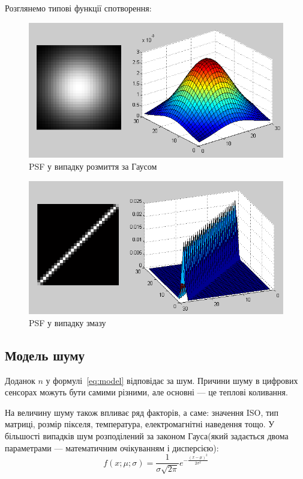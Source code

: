 \documentclass{diploma}
\begin{document}
      Розглянемо типові функції спотворення:
      \begin{figure}
        \centering
        \includegraphics[width=\linewidth]{gaussian-blur.png}
        \caption{PSF у випадку розмиття за Гаусом}
        \label{fig:gaussian-blur}
      \end{figure}
      \begin{figure}
        \centering
        \includegraphics[width=\linewidth]{motion-blur.png}
        \caption{PSF у випадку змазу}
        \label{fig:motion-blur}
      \end{figure}
      \clearpage
    \subsection{Модель шуму}
      Доданок $n$ у формулі~\eqref{eq:model} відповідає за шум.
      Причини шуму в цифрових сенсорах можуть бути самими різними, але основні
      --- це теплові коливання.

      На величину шуму також впливає ряд факторів, а саме: значення ISO, тип
      матриці, розмір пікселя, температура, електромагнітні наведення тощо.
      У більшості випадків шум розподілений за законом Гауса(який задається
      двома параметрами --- математичним очікуванням і дисперсією):
      \begin{equation}
        f\left( x; \mu; \sigma \right) = \frac{1}{\sigma \sqrt{2 \pi}}
        e^{-\frac{\left( x - \mu \right)^2}{2 \sigma^2}}
        \label{eq:gaussian-blur}
      \end{equation}
\end{document}
